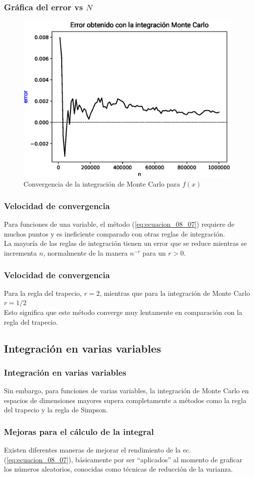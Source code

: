 \begin{frame}[fragile]
\frametitle{Gráfica del error vs $N$}
\begin{figure}
	\centering
	\includegraphics[scale=0.55]{Imagenes/integracionMC01_2017.eps}
	\caption{Convergencia de la integración de Monte Carlo para $f(x)$}
\end{figure}
\end{frame}
\begin{frame}
\frametitle{Velocidad de convergencia}
Para funciones de una variable, el método (\ref{eq:ecuacion_08_07}) requiere de muchos puntos y es ineficiente comparado con otras reglas de integración.
\\
\bigskip
La mayoría de las reglas de integración tienen un error que se reduce mientras se incrementa $n$, normalmente de la manera $n^{-r}$ para un $r>0$.
\end{frame}
\begin{frame}
\frametitle{Velocidad de convergencia}
Para la regla del trapecio, $r = 2$, mientras que para la integración de Monte Carlo $r = 1/2$
\\
\bigskip
Esto significa que este método converge muy lentamente en comparación con la regla del trapecio.
\end{frame}
\subsection{Integración en varias variables}
\begin{frame}
\frametitle{Integración en varias variables}
Sin embargo, para funciones de varias variables, la integración de Monte Carlo en espacios de dimensiones mayores supera completamente a métodos como la regla del trapecio y la regla de Simpson.
\end{frame}
\begin{frame}
\frametitle{Mejoras para el cálculo de la integral}
Existen diferentes maneras de mejorar el rendimiento de la ec. (\ref{eq:ecuacion_08_07}), básicamente por ser \enquote{aplicados} al momento de graficar los números aleatorios, conocidas como técnicas de reducción de la varianza.
\end{frame}
